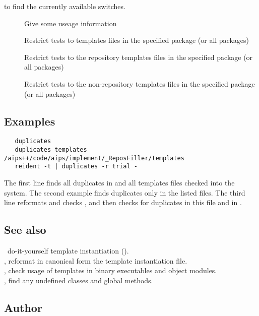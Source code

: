 to find the currently available switches.

\begin{description}
\item[]
    Give some useage information
\item[]
    Restrict tests to templates files in the specified package (or all
    packages)
\item[]
    Restrict tests to the repository templates files in the specified package
    (or all packages)
\item[]
    Restrict tests to the non-repository templates files in the specified package
    (or all packages)
\end{description}

\subsection*{Examples}

\begin{verbatim}
   duplicates
   duplicates templates /aips++/code/aips/implement/_ReposFiller/templates
   reident -t | duplicates -r trial - 
\end{verbatim}

The first line finds all duplicates in  and all templates
files checked into the system. The second example finds duplicates only in
the listed files. The third line reformats and checks , and
then checks for duplicates in this file and in
.

\subsection*{See also}

\aipspp\ do-it-yourself template instantiation ().\\
, reformat in canonical form the template instantiation file.\\
, check usage of templates in binary executables and object
modules.\\
, find any undefined classes and global methods.

\subsection*{Author}


